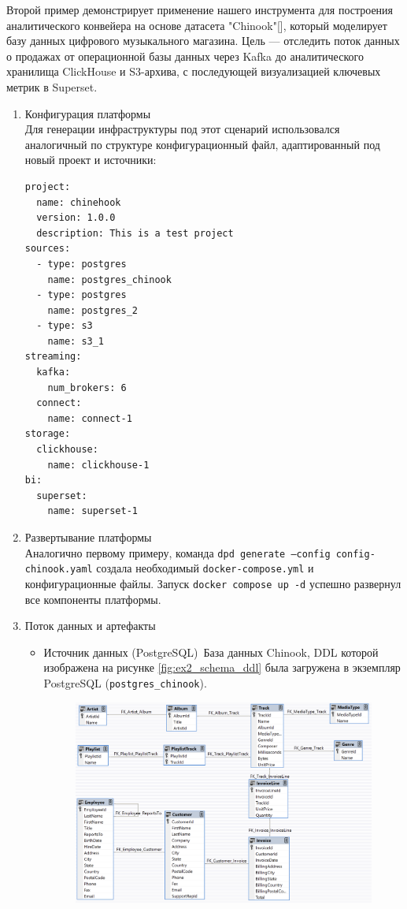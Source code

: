 Второй пример демонстрирует применение нашего инструмента для построения аналитического конвейера на основе датасета "Chinook"[], который моделирует базу данных цифрового музыкального магазина. Цель — отследить поток данных о продажах от операционной базы данных через Kafka до аналитического хранилища ClickHouse и S3-архива, с последующей визуализацией ключевых метрик в Superset.

\begin{enumerate}[1.]
    \item Конфигурация платформы\\
          Для генерации инфраструктуры под этот сценарий использовался аналогичный по структуре конфигурационный файл, адаптированный под новый проект и источники:
          \begin{verbatim}
project:
  name: chinehook
  version: 1.0.0
  description: This is a test project
sources:
  - type: postgres
    name: postgres_chinook
  - type: postgres
    name: postgres_2
  - type: s3
    name: s3_1
streaming:
  kafka:
    num_brokers: 6
  connect:
    name: connect-1
storage:
  clickhouse:
    name: clickhouse-1 
bi:
  superset:
    name: superset-1
    \end{verbatim}
    \item{Развертывание платформы}\\
          Аналогично первому примеру, команда \texttt{dpd generate --config config-chinook.yaml} создала необходимый \texttt{docker-compose.yml} и конфигурационные файлы. Запуск \texttt{docker compose up -d} успешно развернул все компоненты платформы.
    \item{Поток данных и артефакты}
          \begin{itemize}
              \item Источник данных (PostgreSQL)\
                    База данных Chinook, DDL которой изображена на рисунке \ref{fig:ex2_schema_ddl} была загружена в экземпляр PostgreSQL (\texttt{postgres\_chinook}).
                    \begin{figure}[h]
                        \center
                        \includegraphics [scale=0.5] {my_folder/images/ex2_schema_ddl}

\end{figure}
\end{itemize}
\end{enumerate}
